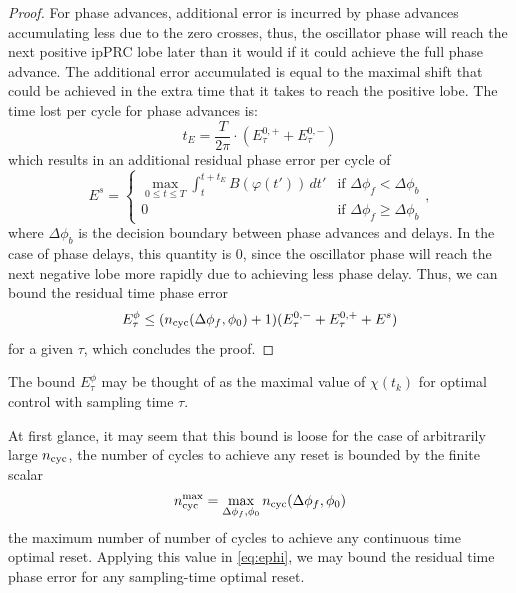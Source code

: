 \begin{proof}
For phase advances, additional error is incurred by phase advances accumulating less due to the zero crosses, thus, the oscillator phase will reach the next positive ipPRC lobe later than it would if it could achieve the full phase advance.
The additional error accumulated is equal to the maximal shift that could be achieved in the extra time that it takes to reach the positive lobe.
The time lost per cycle for phase advances is:
\begin{equation}
    t_E = \frac{T}{2\pi}\cdot(E^{0,+}_\tau + E^{0,-}_\tau)
\end{equation}
which results in an additional residual phase error per cycle of
\begin{equation}
    E^s = \begin{cases}
        \max\limits_{0\leq t\leq T} \int_t^{t+t_E}B(\varphi(t'))\,dt'&\mbox{if } \Delta\phi_f < \Delta\phi_b\\
        0 & \mbox{if }\Delta\phi_f \geq \Delta\phi_b  \end{cases},
\end{equation}
where $\Delta\phi_b$ is the decision boundary between phase advances and delays.
In the case of phase delays, this quantity is 0, since the oscillator phase will reach the next negative lobe more rapidly due to achieving less phase delay.
Thus, we can bound the residual time phase error
\begin{equation}\label{eq:ephi}
    E^{\phi}_\tau \leq (n_{\rm cyc}(\Delta\phi_f, \phi_0)+1)(E^{0,-}_\tau +E^{0,+}_\tau + E^s)
\end{equation}
for a given $\tau$, which concludes the proof.
\end{proof}


The bound $E^{\phi}_\tau$ may be thought of as the maximal value of $\chi(t_k)$ for optimal control with sampling time $\tau$.
\begin{rmk}
At first glance, it may seem that this bound is loose for the case of arbitrarily large $n_{\rm cyc}$, the number of cycles to achieve any reset is bounded by the finite scalar
\begin{equation*}
n_{\rm cyc}^{\max} = \max\limits_{\Delta\phi_f, \phi_0} n_{\rm cyc}(\Delta\phi_f, \phi_0)
\end{equation*}
the maximum number of number of cycles to achieve any continuous time optimal reset.
Applying this value in \eqref{eq:ephi}, we may bound the residual time phase error for any sampling-time optimal reset.
\end{rmk}

